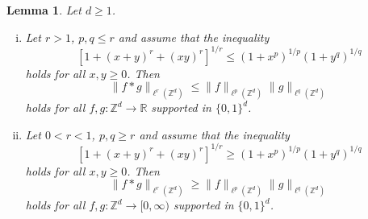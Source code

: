 \documentclass[reqno, 10pt]{amsart}
\theoremstyle{plain}
\numberwithin{equation}{section}
\newtheorem{lemma}[theorem]{Lemma}
\theoremstyle{definition}
\newtheorem*{induction hypothesis}{Induction hypothesis}
\theoremstyle{remark}
\newcommand{\R}{\mathbb{R}}
\newcommand{\Z}{\mathbb{Z}}
\begin{document}
\begin{lemma}\label{lem:induction}
Let $d \geq 1$.
\begin{enumerate}[(i)]
    \item Let $r>1$, $p,q \leq r$ and assume that the inequality
    \begin{equation}\label{eq:numerical r>1}
    [ 1 + (x  + y)^r + (x y)^r  ]^{1/r} \leq (1+x^p)^{1/p} (1+y^q)^{1/q}
\end{equation}
holds for all $x,y \geq 0$. Then
\begin{equation}\label{eq:young general hypercube r>1}
    \|f \ast g\|_{\ell^r({\Z^d})} \leq \|f\|_{\ell^p(\Z^d)} \|g\|_{\ell^q(\Z^d)}
\end{equation}
holds for all $f,g:\Z^d \to \R$ supported in $\{0,1\}^d$.
\item  Let $0<r<1$, $p,q \geq r$ and assume that the inequality
    \begin{equation}\label{eq:numerical r<1}
    [ 1+ (x  + y)^r + (x y)^r  ]^{1/r} \geq (1+x^p)^{1/p} (1+y^q)^{1/q}
\end{equation}
holds for all $x,y \geq 0$. Then
\begin{equation}\label{eq:young general hypercube r<1}
    \|f \ast g\|_{\ell^r({\Z^d})} \geq \|f\|_{\ell^p(\Z^d)} \|g\|_{\ell^q(\Z^d)}
\end{equation}
holds for all $f,g:\Z^d \to [0,\infty)$ supported in $\{0,1\}^d$.
\end{enumerate}
\end{lemma}
\end{document}
